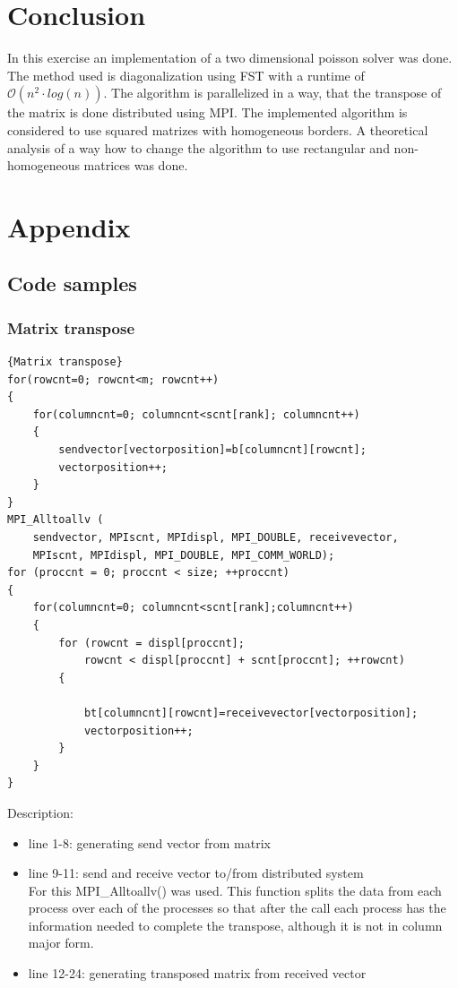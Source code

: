 \documentclass{article}
\begin{document}
\section{Conclusion}
In this exercise an implementation of a two dimensional poisson solver was done. The method used is diagonalization using FST with a runtime of $\mathcal{O}(n^2\cdot log(n))$. The algorithm is parallelized in a way, that the transpose of the matrix is done distributed using MPI. The implemented algorithm is considered to use squared matrizes with homogeneous borders. A theoretical analysis of a way how to change the algorithm to use rectangular and non-homogeneous matrices was done.

\section{Appendix}
\subsection{Code samples}
\subsubsection{Matrix transpose\label{matrixtranspose}}
\begin{lstlisting}[caption=Matrix transposition using MPI]{Matrix transpose}
for(rowcnt=0; rowcnt<m; rowcnt++)
{
    for(columncnt=0; columncnt<scnt[rank]; columncnt++)
    {
        sendvector[vectorposition]=b[columncnt][rowcnt];
        vectorposition++;
    }
}
MPI_Alltoallv (
    sendvector, MPIscnt, MPIdispl, MPI_DOUBLE, receivevector,
    MPIscnt, MPIdispl, MPI_DOUBLE, MPI_COMM_WORLD);
for (proccnt = 0; proccnt < size; ++proccnt)
{
    for(columncnt=0; columncnt<scnt[rank];columncnt++)
    {
        for (rowcnt = displ[proccnt]; 
        	rowcnt < displ[proccnt] + scnt[proccnt]; ++rowcnt)
        {

            bt[columncnt][rowcnt]=receivevector[vectorposition];
            vectorposition++;
        }
    }
}
\end{lstlisting}
Description:
\begin{itemize}
\item line 1-8: generating send vector from matrix
\item line 9-11: send and receive vector to/from distributed system\\
For this MPI\_Alltoallv() was used. This function splits the data from each process over each of the processes so that after the call each process has the information needed to complete the transpose, although it is not in column major form.
\item line 12-24: generating transposed matrix from received vector
\end{itemize}
\end{document}
